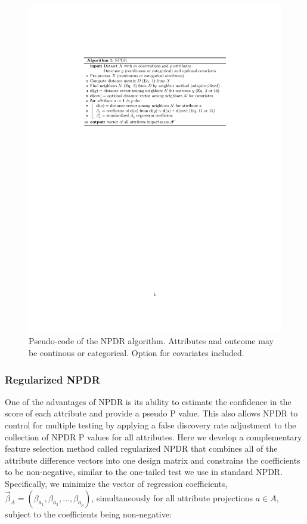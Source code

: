\documentclass{bioinfo}
\begin{document}
\begin{figure}[!tpb]%
\centerline{\includegraphics[trim = 0 497 0 120, clip, scale = 0.68]{../../figs/npdr-algo.pdf}}
\caption{Pseudo-code of the NPDR algorithm. Attributes and outcome may be continous or categorical. Option for covariates included.}\label{fig:pseudocode}
\end{figure}




\subsubsection{Regularized NPDR}

One of the advantages of NPDR is its ability to estimate the confidence in the score of each attribute and provide a pseudo P value. This also allows NPDR to control for multiple testing by applying a false discovery rate adjustment to the collection of NPDR P values for all attributes. Here we develop a complementary feature selection method called regularized NPDR that combines all of the attribute difference vectors into one design matrix and constrains the coefficients to be non-negative, similar to the one-tailed test we use in standard NPDR.
Specifically, we minimize the vector of regression coefficients, $\vec{\beta}_A = (\beta_{a_1}, \beta_{a_2}, \ldots, \beta_{a_p})$, simultaneously for all attribute projections $a \in A$, subject to the coefficients being non-negative: 
\end{document}
